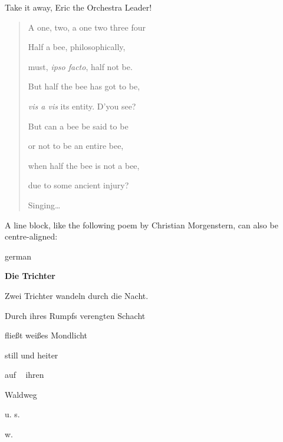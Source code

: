 \documentclass[a4paper]{article}
\newenvironment{DUlineblock}[1]{%
    \list{}{\setlength{\partopsep}{\parskip}
            \addtolength{\partopsep}{\baselineskip}
            \setlength{\topsep}{0pt}
            \setlength{\itemsep}{0.15\baselineskip}
            \setlength{\parsep}{0pt}
            \setlength{\leftmargin}{#1}}
    \raggedright
  }
  {\endlist}
\begin{document}
Take it away, Eric the Orchestra Leader!

\begin{quote}
\begin{DUlineblock}{0em}
\item[] A one, two, a one two three four
\item[] 
\item[] Half a bee, philosophically,
\item[]
\begin{DUlineblock}{\DUlineblockindent}
\item[] must, \emph{ipso facto}, half not be.
\end{DUlineblock}
\item[] But half the bee has got to be,
\item[]
\begin{DUlineblock}{\DUlineblockindent}
\item[] \emph{vis a vis} its entity.  D’you see?
\item[] 
\end{DUlineblock}
\item[] But can a bee be said to be
\item[]
\begin{DUlineblock}{\DUlineblockindent}
\item[] or not to be an entire bee,
\item[]
\begin{DUlineblock}{\DUlineblockindent}
\item[] when half the bee is not a bee,
\item[]
\begin{DUlineblock}{\DUlineblockindent}
\item[] due to some ancient injury?
\item[] 
\end{DUlineblock}
\end{DUlineblock}
\end{DUlineblock}
\item[] Singing…
\end{DUlineblock}
\end{quote}

A line block, like the following poem by Christian Morgenstern, can
also be centre-aligned:

\begin{selectlanguage}{german}
\begin{DUlineblock}{0em}
\centering
\item[] \textbf{Die Trichter}
\item[] 
\item[] Zwei Trichter wandeln durch die Nacht.
\item[] Durch ihres Rumpfs verengten Schacht
\item[] fließt weißes Mondlicht
\item[] still und heiter
\item[] auf   ihren
\item[] Waldweg
\item[] u. s.
\item[] w.
\item[] 
\end{DUlineblock}
\end{selectlanguage}
\end{document}
